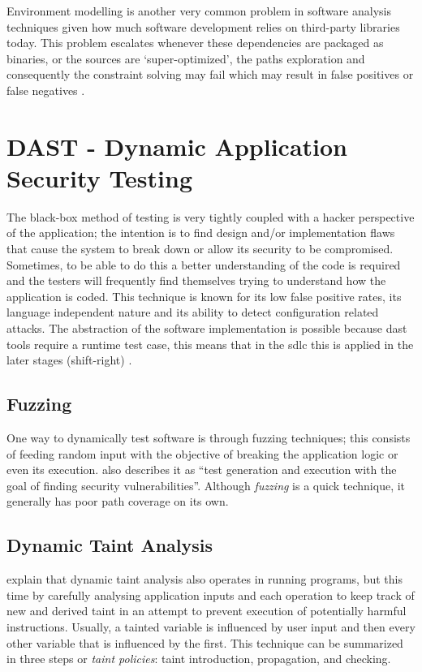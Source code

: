 Environment modelling is another very common problem in software analysis techniques given how much software development relies on third-party libraries today. This problem escalates whenever these dependencies are packaged as binaries, or the sources are `super-optimized', the paths exploration and consequently the constraint solving may fail which may result in false positives or false negatives \citep{Cadar2008}.
\vfill

\section{DAST - Dynamic Application Security Testing} 

The black-box method of testing is very tightly coupled with a hacker perspective of the application; the intention is to find design and/or implementation flaws that cause the system to break down or allow its security to be compromised. Sometimes, to be able to do this a better understanding of the code is required and the testers will frequently find themselves trying to understand how the application is coded.
This technique is known for its low false positive rates, its language independent nature and its ability to detect configuration related attacks. The abstraction of the software implementation is possible because \acrshort{dast} tools require a runtime test case, this means that in the \gls{sdlc} this is applied in the later stages (shift-right) \citep{DAST_description}.

\subsection{Fuzzing}
One way to dynamically test software is through fuzzing techniques; this consists of feeding random input with the objective of breaking the application logic or even its execution. \citet{Godefroid2020} also describes it as ``test generation and execution with the goal of finding security vulnerabilities''. Although \textit{fuzzing} is a quick technique, it generally has poor path coverage on its own.

\subsection{Dynamic Taint Analysis}
\citet{Schwartz2010} explain that dynamic taint analysis also operates in running programs, but this time by carefully analysing application inputs and each operation to keep track of new and derived taint in an attempt to prevent execution of potentially harmful instructions. Usually, a tainted variable is influenced by user input and then every other variable that is influenced by the first. This technique can be summarized in three steps or \textit{taint policies}: taint introduction, propagation, and checking.

